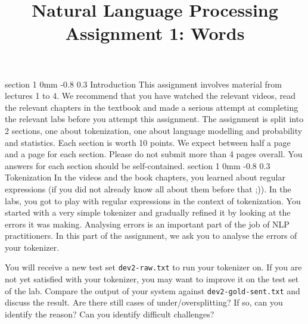 \documentclass[11pt]{article}
\title{{\LARGE Natural Language Processing}\\[1.5mm]{\large Assignment 1: Words}}
\author{}
\date{} %
\makeatletter
\renewcommand{\section}{\@startsection
{section}%
{1}%
{0mm}%
{-0.8\baselineskip}%
{0.3\baselineskip}%
{\bfseries\large}}%
\makeatother
\begin{document}
 

\maketitle
\section{Introduction}
\indent This assignment involves material from lectures 1 to 4. We recommend
that you have watched the relevant videos, read the relevant chapters in the
textbook and made a serious attempt at completing the relevant labs before you
attempt this assignment.
The assignment is split into 2 sections, one about tokenization, one about
language modelling and probability and statistics. Each section is worth 10
points. We expect between half a page and a page for each section. Please do
not submit more than 4 pages overall. 
You answers for each section should be self-contained.
\section{Tokenization}
In the videos and the book chapters, you learned about regular expressions (if
you did not already know all about them before that ;)). In the labs, you got
to play with regular expressions in the context of tokenization.
You started with a very simple tokenizer and gradually refined it by looking at
the errors it was making. Analysing errors is an important part of the job of
NLP practitioners. In this part of the assignment, we ask you to analyse the
errors of your tokenizer.

You will receive a new test set {\tt dev2-raw.txt} to run your tokenizer on.  
If you are not yet satisfied with your tokenizer, you may want to improve it on
the test set of the lab.
Compare the output of your system against {\tt dev2-gold-sent.txt} and discuss
the result. Are there still cases of under/oversplitting? If so, can you
identify the reason? Can you identify difficult challenges?
\end{document}
